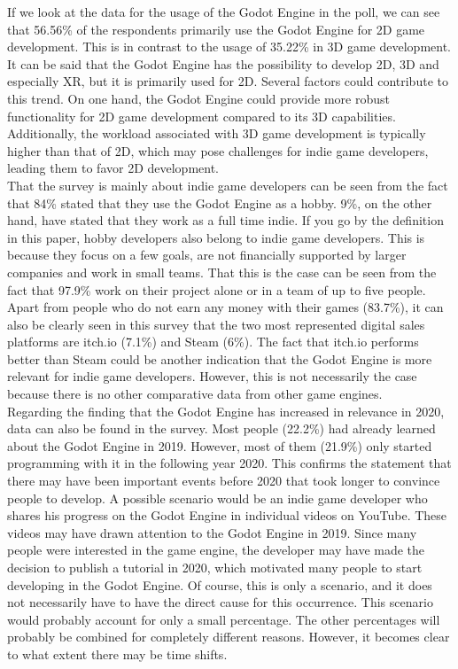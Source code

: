 If we look at the data for the usage of the Godot Engine in the poll, we can see that 56.56\% of the respondents primarily use the Godot Engine for 2D game development.
This is in contrast to the usage of 35.22\% in 3D game development.
It can be said that the Godot Engine has the possibility to develop 2D, 3D and especially XR, but it is primarily used for 2D.
Several factors could contribute to this trend.
On one hand, the Godot Engine could provide more robust functionality for 2D game development compared to its 3D capabilities. 
Additionally, the workload associated with 3D game development is typically higher than that of 2D, which may pose challenges for indie game developers, leading them to favor 2D development.\\

That the survey is mainly about indie game developers can be seen from the fact that 84\% stated that they use the Godot Engine as a hobby.
9\%, on the other hand, have stated that they work as a full time indie.
If you go by the definition in this paper, hobby developers also belong to indie game developers.
This is because they focus on a few goals, are not financially supported by larger companies and work in small teams.
That this is the case can be seen from the fact that 97.9\% work on their project alone or in a team of up to five people.
Apart from people who do not earn any money with their games (83.7\%), it can also be clearly seen in this survey that the two most represented digital sales platforms are itch.io (7.1\%) and Steam (6\%).
The fact that itch.io performs better than Steam could be another indication that the Godot Engine is more relevant for indie game developers.
However, this is not necessarily the case because there is no other comparative data from other game engines. \\

Regarding the finding that the Godot Engine has increased in relevance in 2020, data can also be found in the survey.
Most people (22.2\%) had already learned about the Godot Engine in 2019.
However, most of them (21.9\%) only started programming with it in the following year 2020.
This confirms the statement that there may have been important events before 2020 that took longer to convince people to develop.
A possible scenario would be an indie game developer who shares his progress on the Godot Engine in individual videos on YouTube.
These videos may have drawn attention to the Godot Engine in 2019.
Since many people were interested in the game engine, the developer may have made the decision to publish a tutorial in 2020, which motivated many people to start developing in the Godot Engine.
Of course, this is only a scenario, and it does not necessarily have to have the direct cause for this occurrence.
This scenario would probably account for only a small percentage.
The other percentages will probably be combined for completely different reasons.
However, it becomes clear to what extent there may be time shifts.
